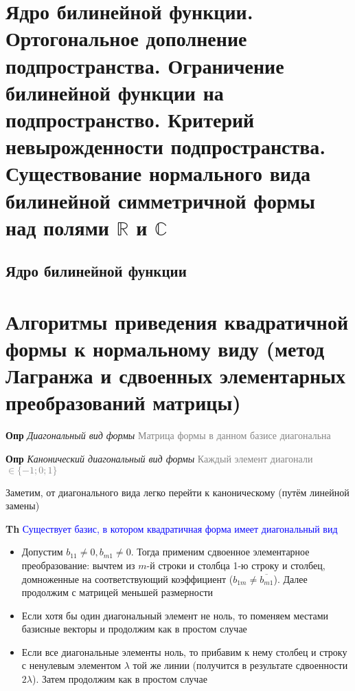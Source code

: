 \documentclass[a4paper, 14pt]{article}
\begin{document}
    \section{Ядро билинейной функции.
    Ортогональное дополнение подпространства.
    Ограничение билинейной функции на подпространство.
    Критерий невырожденности подпространства.
    Существование нормального вида билинейной симметричной формы над полями $\mathbb{R}$ и $\mathbb{C}$}

    \subsection{Ядро билинейной функции}

    \section{Алгоритмы приведения квадратичной формы к нормальному виду (метод Лагранжа и сдвоенных элементарных
    преобразований матрицы)}

    \textbf{Опр} \textit{Диагональный вид формы} \textcolor{gray}{Матрица формы в данном базисе диагональна}

    \textbf{Опр} \textit{Канонический диагональный вид формы} \textcolor{gray}{Каждый элемент диагонали $\in \{-1;0;1\}$}

    Заметим, от диагонального вида легко перейти к каноническому (путём линейной замены)

    \textbf{Th} \textcolor{blue}{Существует базис, в котором квадратичная форма имеет диагональный вид}

    \begin{itemize}
        \item Допустим $b_{11} \neq 0, b_{m1} \neq 0$.
        Тогда применим сдвоенное элементарное преобразование: вычтем из $m$-й строки и столбца 1-ю строку и столбец,
        домноженные на соответствующий коэффициент ($b_{1m} \neq \overline{b_{m1}}$).
        Далее продолжим с матрицей меньшей размерности
        \item Если хотя бы один диагональный элемент не ноль, то поменяем местами базисные векторы и продолжим
        как в простом случае
        \item Если все диагональные элементы ноль, то прибавим к нему столбец и строку с ненулевым элементом $\lambda$
        той же
        линии (получится в результате сдвоенности $2\lambda$). Затем продолжим как в простом случае
    \end{itemize}
\end{document}
